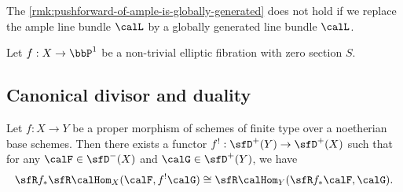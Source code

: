 \begin{remark}
	The \cref{rmk:pushforward-of-ample-is-globally-generated} does not hold if we replace the ample line bundle $\calL$ by a globally generated line bundle $\calL$.

	Let $f: X \to \bbP^1$ be a non-trivial elliptic fibration with zero section $S$.

	\Yang{}

\end{remark}





\subsection{Canonical divisor and duality}

\begin{theorem}
	Let $f:X\to Y$ be a proper morphism of schemes of finite type over a noetherian base schemes.
	Then there exists a functor $f^!:\sfD^+(Y)\to \sfD^+(X)$ such that for any $\calF\in \sfD^-(X)$ and $\calG\in \sfD^+(Y)$, we have
	\[ \sfR f_*\sfR \calHom_X(\calF, f^!\calG) \cong \sfR \calHom_Y(\sfR f_*\calF, \calG). \]
\end{theorem}

